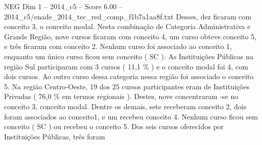 \begin{textsample}{NEG Dim 1 – 2014\_c5 – Score 6.00 – 2014\_c5/enade\_2014\_tec\_red\_comp\_f1b7a1aa8f.txt}
Desses, dez ficaram com conceito 3, o conceito modal.
Nesta combinação de Categoria Administrativa e Grande Região, nove cursos ficaram com conceito 4, um curso obteve conceito 5, e três ficaram com conceito 2.
Nenhum curso foi associado ao conceito 1, enquanto um único curso ficou sem conceito ( SC ).
As Instituições Públicas na região Sul participaram com 3 cursos ( 11,1 \% ) e o conceito modal foi 4, com dois cursos.
Ao outro curso dessa categoria nessa região foi associado o conceito 5.
Na região Centro-Oeste, 19 dos 25 cursos participantes eram de Instituições Privadas ( 76,0 \% em termos regionais ).
Destes, nove concentraram -se no conceito 3, conceito modal.
Dentre os demais, sete receberam conceito 2, dois foram associados ao conceito1, e um recebeu conceito 4.
Nenhum curso ficou sem conceito ( SC ) ou recebeu o conceito 5.
Dos seis cursos oferecidos por Instituições Públicas, três foram

\end{textsample}
